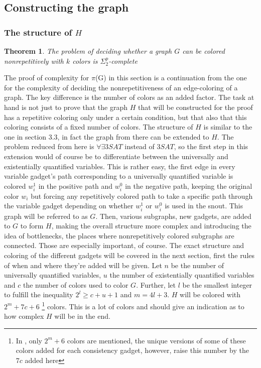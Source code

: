 \documentclass[12pt,a4paper]{article}
\newtheorem{theorem}{Theorem}
\begin{document}
\subsection{Constructing the graph}
\subsubsection{The structure of $H$}

\begin{theorem}
The problem of deciding whether a graph $G$ can be colored nonrepetitively with $k$ colors is $\Sigma^p_2$-complete
\end{theorem}
The proof of complexity for $\pi$(G) in this section is a continuation from the one for the complexity of deciding the nonrepetitiveness of an edge-coloring of a graph. The key difference is the number of colors as an added factor. The task at hand is not just to prove that the graph $H$ that will be constructed for the proof has a repetitive coloring only under a certain condition, but that also that this coloring consists of a fixed number of colors. 
The structure of $H$ is similar to the one in section 3.3, in fact the graph from there can be extended to $H$. The problem reduced from here is $\forall \exists 3SAT$ instead of $3SAT$, so the first step in this extension would of course be to differentiate between the universally and existentially quantified variables. This is rather easy, the first edge in every variable gadget's path corresponding to a universally quantified variable is colored $w^1_i$ in the positive path and $w^0_i$ in the negative path, keeping the original color $w_i$ but forcing any repetitively colored path to take a specific path through the variable gadget depending on whether $w^1_i$ or $w^0_i$ is used in the snout. This graph will be referred to as $G$.
\newline
Then, various subgraphs, new gadgets, are added to $G$ to form $H$, making the overall structure more complex and introducing the idea of bottlenecks, the places where nonrepetitively colored subgraphs are connected. Those are especially important, of course. The exact structure and coloring of the different gadgets will be covered in the next section, first the rules of when and where they're added will be given. Let $n$ be the number of universally quantified variables, $u$ the number of existentially quantified variables and $c$ the number of colors used to color $G$. Further, let $l$ be the smallest integer to fulfill the inequality $2^l \geq c + u + 1$ and $m = 4l +3$. $H$ will be colored with $2^m + 7c + 6$ \footnote{In \citep{Manin2008}, only $2^m +6$ colors are mentioned, the unique versions of some of these colors added for each consistency gadget, however, raise this number by the $7c$ added here} colors. This is a lot of colors and should give an indication as to how complex $H$ will be in the end.
\end{document}
